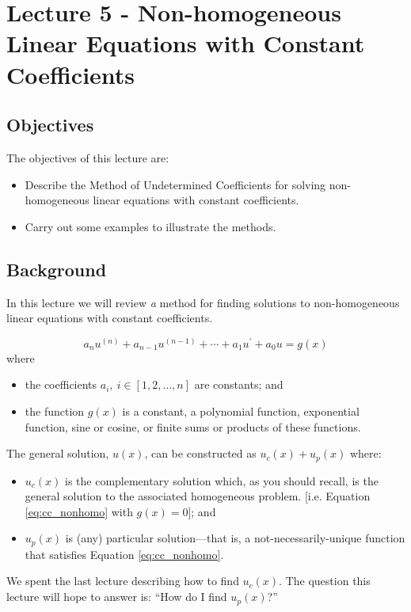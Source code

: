 \chapter{Lecture 5 - Non-homogeneous Linear Equations with Constant Coefficients}
\label{ch:lec5}
\section{Objectives}
The objectives of this lecture are:
\begin{itemize}
\item Describe the Method of Undetermined Coefficients for solving non-homogeneous linear equations with constant coefficients.
\item Carry out some examples to illustrate the methods.
\end{itemize}

\section{Background}
In this lecture we will review \emph{a} method for finding solutions to non-homogeneous linear equations with constant coefficients.

\begin{equation}
a_nu^{(n)} + a_{n-1}u^{(n-1)}+\cdots+a_1u^{\prime}+a_0u = g(x)
\label{eq:cc_nonhomo}
\end{equation}
where
\begin{itemize}
\item the coefficients $a_i, \ i\in [1,2,\dots,n]$ are constants; and
\item the function $g(x)$ is a constant, a polynomial function, exponential function, sine or cosine, or finite sums or products of these functions.
\end{itemize}
The general solution, $u(x)$, can be constructed as $u_c(x)+u_p(x)$ where:
\begin{itemize}
\item $u_c(x)$ is the complementary solution which, as you should recall, is the general solution to the associated homogeneous problem. [i.e. Equation \ref{eq:cc_nonhomo} with $g(x)=0$]; and
\item $u_p(x)$ is (any) particular solution---that is, a not-necessarily-unique function that satisfies Equation \ref{eq:cc_nonhomo}.
\end{itemize}
We spent the last lecture describing how to find $u_c(x)$.  The question this lecture will hope to answer is: ``How do I find $u_p(x)$?''  
